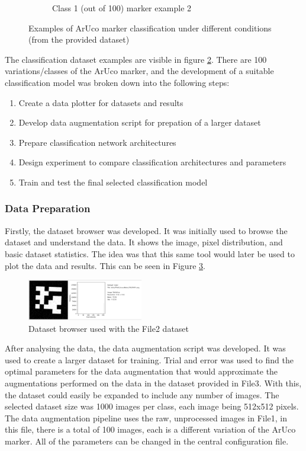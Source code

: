 \documentclass[conference]{IEEEtran}
\begin{document}
\begin{figure}[h]
\begin{subfigure}[b]{0.2\textwidth}
      \caption{Class 1 (out of 100) marker example 2}
      \label{fig:class_ex4}
  \end{subfigure}
  \caption{Examples of ArUco marker classification under different conditions (from the provided dataset)}
  \label{fig:classification_examples}
\end{figure}

The classification dataset examples are visible in figure \ref{fig:classification_examples}.
There are 100 variations/classes of the ArUco marker, and the development of a suitable classification model was broken down into the following steps:

\begin{enumerate}
  \item Create a data plotter for datasets and results
  \item Develop data augmentation script for prepation of a larger dataset  
  \item Prepare classification network architectures
  \item Design experiment to compare classification architectures and parameters
  \item Train and test the final selected classification model
\end{enumerate}

\subsubsection{Data Preparation}

Firstly, the dataset browser was developed. It was initially used to browse the dataset and understand the data. It shows the image,
pixel distribution, and basic dataset statistics.
The idea was that this same tool would later be used to plot the data and results. This can be seen in Figure \ref{fig:data_browser_1}.

\begin{figure}[h]
  \centering
  \includegraphics[width=0.45\textwidth]{images/aruco-dataset-browser-1.png}
  \caption{Dataset browser used with the File2 dataset}
  \label{fig:data_browser_1}
\end{figure}

After analysing the data, the data augmentation script was developed. It was used to create a larger dataset for training.
Trial and error was used to find the optimal parameters for the data augmentation that would approximate the augmentations performed
on the data in the dataset provided in File3. With this, the dataset could easily be expanded to include any number of images. The selected
dataset size was 1000 images per class, each image being 512x512 pixels. The data augmentation pipeline uses the raw, unprocessed images in File1, in this file, 
there is a total of 100 images, each is a different variation of the ArUco marker. All of the parameters can be changed in the central configuration file.
\end{document}
